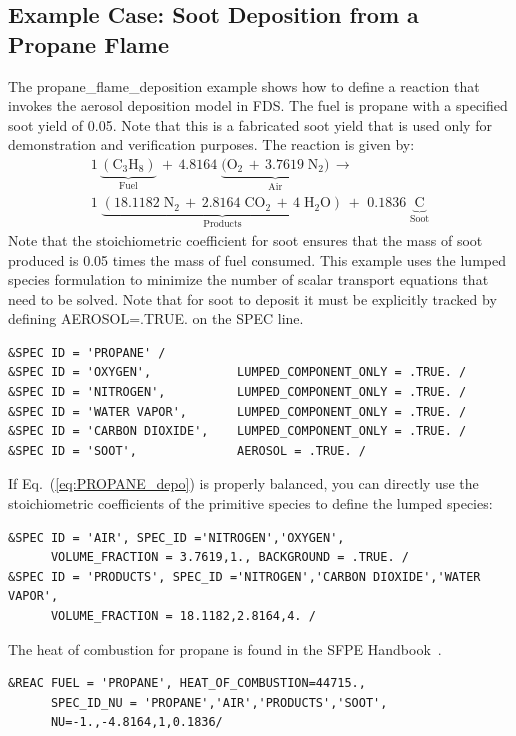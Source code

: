 \documentclass[11pt]{book}
\begin{document}
\subsection{Example Case: Soot Deposition from a Propane Flame}

The {\ct propane\_flame\_deposition} example shows how to define a reaction that invokes the aerosol deposition model in FDS. The fuel is propane with a specified soot yield of 0.05. Note that this is a fabricated soot yield that is used only for demonstration and verification purposes. The reaction is given by:
\begin{multline}\label{eq:PROPANE_depo}
1\,\underbrace{\mathrm{(C_3H_8)}}_\text{Fuel} \,+\, 4.8164 \; \underbrace{\mathrm{(O_2\,+\, 3.7619 \; N_2})}_\text{Air} \, \longrightarrow \\
1 \; \underbrace{\mathrm{(18.1182 \; N_2 \, + \, 2.8164 \; CO_2 \,+ \, 4\; H_2O)}}_\text{Products} \,+\,
\,0.1836 \; \underbrace{\mathrm{C}}_\text{Soot}
\end{multline}
Note that the stoichiometric coefficient for soot ensures that the mass of soot produced is 0.05 times the mass of fuel consumed. This example uses the lumped species formulation to minimize the number of scalar transport equations that need to be solved. Note that for soot to deposit it must be explicitly tracked by defining {\ct AEROSOL=.TRUE.} on the {\ct SPEC} line.
\begin{lstlisting}
&SPEC ID = 'PROPANE' /
&SPEC ID = 'OXYGEN',            LUMPED_COMPONENT_ONLY = .TRUE. /
&SPEC ID = 'NITROGEN',          LUMPED_COMPONENT_ONLY = .TRUE. /
&SPEC ID = 'WATER VAPOR',       LUMPED_COMPONENT_ONLY = .TRUE. /
&SPEC ID = 'CARBON DIOXIDE',    LUMPED_COMPONENT_ONLY = .TRUE. /
&SPEC ID = 'SOOT',              AEROSOL = .TRUE. /
\end{lstlisting}
If Eq.~(\ref{eq:PROPANE_depo}) is properly balanced, you can directly use the stoichiometric coefficients of the primitive species to define the lumped species:

\begin{lstlisting}
&SPEC ID = 'AIR', SPEC_ID ='NITROGEN','OXYGEN',
      VOLUME_FRACTION = 3.7619,1., BACKGROUND = .TRUE. /
&SPEC ID = 'PRODUCTS', SPEC_ID ='NITROGEN','CARBON DIOXIDE','WATER VAPOR',
      VOLUME_FRACTION = 18.1182,2.8164,4. /
\end{lstlisting}

\noindent
The heat of combustion for propane is found in the SFPE Handbook~\cite{SFPE:Tewarson}.

\begin{lstlisting}
&REAC FUEL = 'PROPANE', HEAT_OF_COMBUSTION=44715.,
      SPEC_ID_NU = 'PROPANE','AIR','PRODUCTS','SOOT',
      NU=-1.,-4.8164,1,0.1836/
\end{lstlisting}
\end{document}
